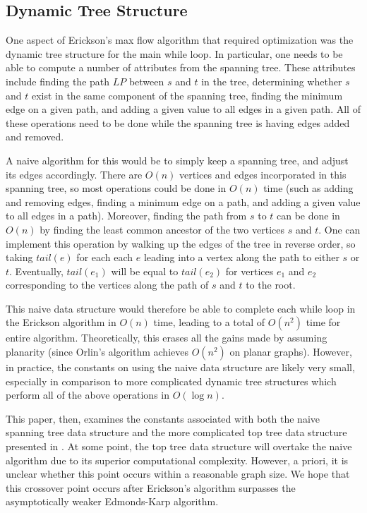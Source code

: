 \documentclass[12pt]{article}
\begin{document}
\subsection{Dynamic Tree Structure}

One aspect of Erickson's max flow algorithm that required optimization was the dynamic tree structure for the main while loop. In particular, one needs to be able to compute a number of attributes from the spanning tree. These attributes include finding the path $LP$ between $s$ and $t$ in the tree, determining whether $s$ and $t$ exist in the same component of the spanning tree, finding the minimum edge on a given path, and adding a given value to all edges in a given path. All of these operations need to be done while the spanning tree is having edges added and removed. 

A naive algorithm for this would be to simply keep a spanning tree, and adjust its edges accordingly. There are $O(n)$ vertices and edges incorporated in this spanning tree, so most operations could be done in $O(n)$ time (such as adding and removing edges, finding a minimum edge on a path, and adding a given value to all edges in a path). Moreover, finding the path from $s$ to $t$ can be done in $O(n)$ by finding the least common ancestor of the two vertices $s$ and $t$. One can implement this operation by walking up the edges of the tree in reverse order, so taking $tail(e)$ for each each $e$ leading into a vertex along the path to either $s$ or $t$. Eventually, $tail(e_1)$ will be equal to $tail(e_2)$ for vertices $e_1$ and $e_2$ corresponding to the vertices along the path of $s$ and $t$ to the root. 

This naive data structure would therefore be able to complete each while loop in the Erickson algorithm in $O(n)$ time, leading to a total of $O(n^2)$ time for entire algorithm. Theoretically, this erases all the gains made by assuming planarity (since Orlin's algorithm achieves $O(n^2)$ on planar graphs). However, in practice, the constants on using the naive data structure are likely very small, especially in comparison to more complicated dynamic tree structures which perform all of the above operations in $O(\log n)$. 

This paper, then, examines the constants associated with both the naive spanning tree data structure and the more complicated top tree data structure presented in \cite{tarjanwerneck2005}. At some point, the top tree data structure will overtake the naive algorithm due to its superior computational complexity. However, a priori, it is unclear whether this point occurs within a reasonable graph size.  We hope that this crossover point occurs after Erickson's algorithm surpasses the asymptotically weaker Edmonds-Karp algorithm.
\end{document}
